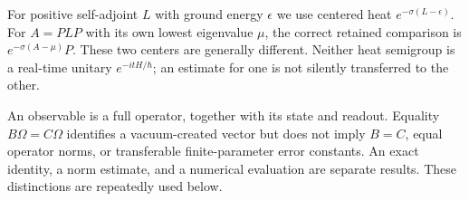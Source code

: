 For positive self-adjoint $L$ with ground energy $\epsilon$ we use centered heat $e^{-\sigma(L-\epsilon)}$. For $A=PLP$ with its own lowest eigenvalue $\mu$, the correct retained comparison is $e^{-\sigma(A-\mu)}P$. These two centers are generally different. Neither heat semigroup is a real-time unitary $e^{-itH/\hbar}$; an estimate for one is not silently transferred to the other.

An observable is a full operator, together with its state and readout. Equality $B\Omega=C\Omega$ identifies a vacuum-created vector but does not imply $B=C$, equal operator norms, or transferable finite-parameter error constants. An exact identity, a norm estimate, and a numerical evaluation are separate results. These distinctions are repeatedly used below.
